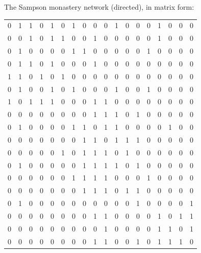 \documentclass[slidestop,compress, 10pt]{beamer}
\begin{document}
{The Sampson monastery network (directed), in matrix form:
{\tiny
\begin{table}[ht]
\begin{center}
\begin{tabular}{rrrrrrrrrrrrrrrrrr}
  \hline
0 & 1 & 1 & 0 & 1 & 0 & 1 & 0 & 0 & 0 & 1 & 0 & 0 & 0 & 1 & 0 & 0 & 0 \\ 
0 & 0 & 1 & 0 & 1 & 1 & 0 & 0 & 1 & 0 & 0 & 0 & 0 & 0 & 1 & 0 & 0 & 0 \\ 
0 & 1 & 0 & 0 & 0 & 0 & 1 & 1 & 0 & 0 & 0 & 0 & 0 & 1 & 0 & 0 & 0 & 0 \\ 
0 & 1 & 1 & 0 & 1 & 0 & 0 & 0 & 1 & 0 & 0 & 0 & 0 & 0 & 0 & 0 & 0 & 0 \\ 
1 & 1 & 0 & 1 & 0 & 1 & 0 & 0 & 0 & 0 & 0 & 0 & 0 & 0 & 0 & 0 & 0 & 0 \\ 
0 & 1 & 0 & 0 & 1 & 0 & 1 & 0 & 0 & 0 & 1 & 0 & 0 & 1 & 0 & 0 & 0 & 0 \\ 
1 & 0 & 1 & 1 & 1 & 0 & 0 & 0 & 1 & 1 & 0 & 0 & 0 & 0 & 0 & 0 & 0 & 0 \\ 
0 & 0 & 0 & 0 & 0 & 0 & 0 & 0 & 1 & 1 & 1 & 0 & 1 & 0 & 0 & 0 & 0 & 0 \\ 
0 & 1 & 0 & 0 & 0 & 0 & 1 & 1 & 0 & 1 & 1 & 0 & 0 & 0 & 0 & 1 & 0 & 0 \\ 
0 & 0 & 0 & 0 & 0 & 0 & 0 & 1 & 1 & 0 & 1 & 1 & 1 & 0 & 0 & 0 & 0 & 0 \\ 
0 & 0 & 0 & 0 & 0 & 1 & 0 & 1 & 1 & 1 & 0 & 1 & 0 & 0 & 0 & 0 & 0 & 0 \\ 
0 & 1 & 0 & 0 & 0 & 0 & 0 & 1 & 1 & 1 & 1 & 0 & 1 & 0 & 0 & 0 & 0 & 0 \\ 
0 & 0 & 0 & 0 & 0 & 0 & 1 & 1 & 1 & 1 & 0 & 0 & 0 & 1 & 0 & 0 & 0 & 0 \\ 
0 & 0 & 0 & 0 & 0 & 0 & 0 & 1 & 1 & 1 & 0 & 1 & 1 & 0 & 0 & 0 & 0 & 0 \\ 
0 & 1 & 0 & 0 & 0 & 0 & 0 & 0 & 0 & 0 & 0 & 0 & 1 & 0 & 0 & 0 & 0 & 1 \\ 
0 & 0 & 0 & 0 & 0 & 0 & 0 & 0 & 1 & 1 & 0 & 0 & 0 & 0 & 1 & 0 & 1 & 1 \\ 
0 & 0 & 0 & 0 & 0 & 0 & 0 & 0 & 0 & 1 & 0 & 0 & 0 & 0 & 1 & 1 & 0 & 1 \\ 
0 & 0 & 0 & 0 & 0 & 0 & 0 & 0 & 1 & 1 & 0 & 0 & 1 & 0 & 1 & 1 & 1 & 0 \\ 
   \hline
\end{tabular}
\end{center}
\end{table}}
}
\frame
\end{document}
